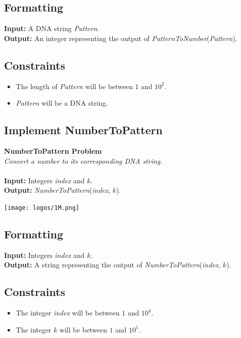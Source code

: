 \documentclass{article}
\begin{document}
\subsection*{Formatting}
\textbf{Input:} A DNA string \emph{Pattern}.\\
\noindent \textbf{Output:} An integer representing the output of \emph{PatternToNumber}(\emph{Pattern}).

\subsection*{Constraints}
\begin{itemize}
    \item The length of \emph{Pattern} will be between $1$ and $10^2$.
    \item \emph{Pattern} will be a DNA string.
\end{itemize}
\pagebreak
\subsection{Implement NumberToPattern}
\hline\vspace{5}
\noindent \textbf{NumberToPattern Problem}\\
\emph{Convert a number to its corresponding DNA string}.\\ \\
\textbf{Input:} Integers \emph{index} and $k$.\\
\textbf{Output:} \emph{NumberToPattern}(\emph{index}, $k$).
\begin{center}
    \texttt{[image: logos/1M.png]} 
\end{center}
\hline\vspace{5}

\subsection*{Formatting}
\textbf{Input:} Integers \emph{index} and $k$.\\
\noindent \textbf{Output:} A string representing the output of \emph{NumberToPattern}(\emph{index}, $k$).

\subsection*{Constraints}
\begin{itemize}
    \item The integer \emph{index} will be between $1$ and $10^4$.
    \item The integer $k$ will be between $1$ and $10^1$.
\end{itemize}
\pagebreak
\end{document}
